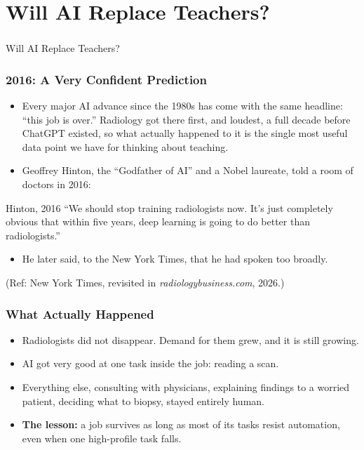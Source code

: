 \section[TaskvJob]{Will AI Replace Teachers?}

\begin{frame}[fragile]\frametitle{}
\begin{center}
{\Large Will AI Replace Teachers?}
\end{center}
\end{frame}

\begin{frame}[fragile]\frametitle{2016: A Very Confident Prediction}
\begin{itemize}
\item Every major AI advance since the 1980s has come with the same headline: ``this job is over.'' Radiology got there first, and loudest, a full decade before ChatGPT existed, so what actually happened to it is the single most useful data point we have for thinking about teaching.
\item Geoffrey Hinton, the ``Godfather of AI'' and a Nobel laureate, told a room of doctors in 2016:
\end{itemize}
\begin{alertblock}{Hinton, 2016}
``We should stop training radiologists now. It's just completely obvious that within five years, deep learning is going to do better than radiologists.''
\end{alertblock}
\begin{itemize}
\item He later said, to the New York Times, that he had spoken too broadly.
\end{itemize}
{\tiny (Ref: New York Times, revisited in \emph{radiologybusiness.com}, 2026.)}
\end{frame}

\begin{frame}[fragile]\frametitle{What Actually Happened}
\begin{itemize}
\item Radiologists did not disappear. Demand for them grew, and it is still growing.
\item AI got very good at one task inside the job: reading a scan.
\item Everything else, consulting with physicians, explaining findings to a worried patient, deciding what to biopsy, stayed entirely human.
\item \textbf{The lesson:} a job survives as long as most of its tasks resist automation, even when one high-profile task falls.
\end{itemize}
\end{frame}

